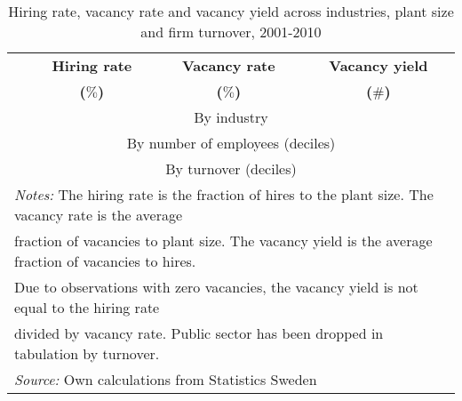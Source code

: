       \begin{table}[htbp]\centering
      \caption{\label{tab:vacancy_yield} Hiring rate, vacancy rate and vacancy yield across industries, plant size and firm turnover, 2001-2010
      \textbf{} }\begin{tabularx} {\textwidth} {  l  c  c  c} \\ \hline %
      \textbf{ } & \textbf{ Hiring rate } & \textbf{ Vacancy rate } & \textbf{  Vacancy yield  } \\
			\textbf{ } & \textbf{  ($\%$) } & \textbf{ ($\%$) } & \textbf{ ($\#$) } \\
      \midrule
			    \multicolumn{4}{c}{By industry} \\
			\midrule

     \midrule
						   \multicolumn{4}{c}{By number of employees (deciles)} \\
			\midrule

     \midrule
						  \multicolumn{4}{c}{By turnover (deciles)} \\
			\midrule

				\hline
      \multicolumn{4}{l}{\footnotesize{\emph{Notes:} The hiring rate is the fraction of hires to the plant size. The vacancy rate is the average }} \\
			\multicolumn{4}{l}{\footnotesize{fraction of vacancies to plant size. The vacancy yield is the average fraction of vacancies to hires. } } \\
			\multicolumn{4}{l}{\footnotesize{Due to observations with zero vacancies, the vacancy yield is not equal to the hiring rate } } \\ 
      \multicolumn{4}{l}{\footnotesize{divided by vacancy rate. Public sector has been dropped in tabulation by turnover.} } \\
			\multicolumn{4}{l}{\footnotesize{\emph{Source:} Own calculations from Statistics Sweden } }

      \end{tabularx}
      \end{table}
